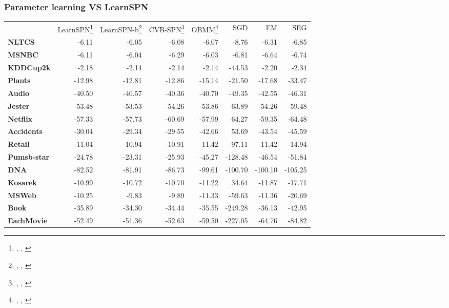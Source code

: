 \documentclass[10pt, t, xcolor={usenames,dvipsnames,svgnames}, compress]{beamer}
\newcommand{\customcite}[1]{\footnote{\scriptsize \citeauthor{#1}, \citetitle{#1}, \citeyear{#1}}}
\begin{document}
\begin{frame}[t]
  \frametitle{Parameter learning VS LearnSPN}
  \begin{table}
    \centering
    \scriptsize
    \setlength{\tabcolsep}{3pt}  
    \begin{tabular}{l r r r r r r r}
      & \textsf{LearnSPN}\customcite{Gens2013} & \textsf{LearnSPN-b}\customcite{Vergari2015} & \textsf{CVB-SPN}\customcite{Zhao2016a} & \textsf{OBMM}\customcite{Rashwan2016} & \textsf{SGD}\footnotemark[52] & \textsf{EM}\footnotemark[52] & \textsf{SEG}\footnotemark[52] \\
      \textbf{NLTCS}      & -6.11   & -6.05   & -6.08   & -6.07   & -8.76   & -6.31   & -6.85   \\
      \textbf{MSNBC}      & -6.11   & -6.04   & -6.29   & -6.03   & -6.81   & -6.64   & -6.74   \\
      \textbf{KDDCup2k}   & -2.18   & -2.14   & -2.14   & -2.14   & -44.53  & -2.20   & -2.34   \\
      \textbf{Plants}     & -12.98  & -12.81  & -12.86  & -15.14  & -21.50  & -17.68  & -33.47  \\
      \textbf{Audio}      & -40.50  & -40.57  & -40.36  & -40.70  & -49.35  & -42.55  & -46.31  \\
      \textbf{Jester}     & -53.48  & -53.53  & -54.26  & -53.86  & 63.89   & -54.26  & -59.48  \\
      \textbf{Netflix}    & -57.33  & -57.73  & -60.69  & -57.99  & 64.27   & -59.35  & -64.48  \\
      \textbf{Accidents}  & -30.04  & -29.34  & -29.55  & -42.66  & 53.69   & -43.54  & -45.59  \\
      \textbf{Retail}     & -11.04  & -10.94  & -10.91  & -11.42  & -97.11  & -11.42  & -14.94  \\
      \textbf{Pumsb-star} & -24.78  & -23.31  & -25.93  & -45.27  & -128.48 & -46.54  & -51.84  \\
      \textbf{DNA}        & -82.52  & -81.91  & -86.73  & -99.61  & -100.70 & -100.10 & -105.25 \\
      \textbf{Kosarek}    & -10.99  & -10.72  & -10.70  & -11.22  & 34.64   & -11.87  & -17.71  \\
      \textbf{MSWeb}      & -10.25  & -9.83   & -9.89   & -11.33  & -59.63  & -11.36  & -20.69  \\
      \textbf{Book}       & -35.89  & -34.30  & -34.44  & -35.55  & -249.28 & -36.13  & -42.95  \\
      \textbf{EachMovie}  & -52.49  & -51.36  & -52.63  & -59.50  & -227.05 & -64.76  & -84.82  \\

\end{tabular}
\end{table}
\end{frame}
\end{document}
